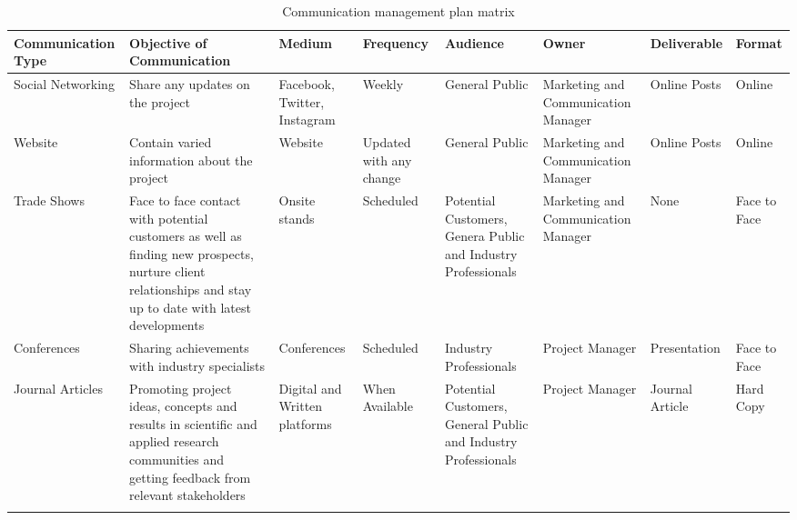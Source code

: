 \begin{landscape}
	
	\begin{longtable}{| >{\raggedright\arraybackslash}p{2.8cm}  | >{\raggedright\arraybackslash}p{2.8cm} | >{\raggedright\arraybackslash}p{2cm} | >{\raggedright\arraybackslash}p{2cm} | >{\raggedright\arraybackslash}p{2cm} | >{\raggedright\arraybackslash}p{2.4cm} | >{\raggedright\arraybackslash}p{2.4cm} | >{\raggedright\arraybackslash}p{2.4cm} |  }
		
		\toprule [2pt]
		
		\textbf{Communication Type} & \textbf{Objective of Communication} & \textbf{Medium}  &\textbf{Frequency} &\textbf{Audience}& \textbf{Owner}& \textbf{Deliverable} &\textbf{Format} \\  
		
		\midrule [1.5pt]
		\endhead
		
		Social Networking& Share any updates on the project  & Facebook, Twitter, Instagram   &Weekly   &General Public     &  Marketing and Communication Manager &Online Posts   &Online\\  
		
		\hline
		
		Website& Contain varied information about the project  &   Website &Updated with any change   &  General Public   &  Marketing and Communication Manager & Online Posts  &Online\\  
		
		\hline
		
		Trade Shows&Face to face contact with potential customers as well as finding new prospects, nurture client relationships and stay up to date with latest developments   &  Onsite stands  & Scheduled  &  Potential Customers, Genera Public and Industry Professionals   &Marketing and Communication Manager   & None  &Face to Face\\  
		
		\hline
		
		Conferences& Sharing achievements with industry specialists  &  Conferences  &Scheduled   & Industry Professionals    & Project Manager  & Presentation  &Face to Face\\  
		
		\hline
		
		Journal Articles&Promoting project ideas, concepts and results in scientific and applied research communities and getting feedback from relevant stakeholders   &Digital and Written platforms    &  When Available &  Potential Customers, General Public and Industry Professionals   & Project Manager  & Journal Article  &Hard Copy\\  
		
		\bottomrule[2pt]
		
		\caption{Communication management plan matrix}
	\end{longtable}
	
	\vspace*{\fill}
		
\end{landscape}